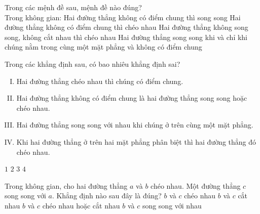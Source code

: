 \begin{ex}%
	Trong các mệnh đề sau, mệnh đề nào đúng?\\
	Trong không gian:
	\choice
	{Hai đường thẳng không có điểm chung thì song song}
	{Hai đường thẳng không có điểm chung thì chéo nhau}
	{Hai đường thẳng không song song, không cắt nhau thì chéo nhau}
	{\True Hai đường thẳng song song khi và chỉ khi chúng nằm trong cùng một mặt phẳng và không có điểm chung}
\end{ex}

\begin{ex}%
Trong các khẳng định sau, có bao nhiêu khẳng định sai?
\begin{enumerate}[(I)]
	\item 	Hai đường thẳng chéo nhau thì chúng có điểm chung.
	\item 
	Hai đường thẳng không có điểm chung là hai đường thẳng song song hoặc chéo nhau.
	\item Hai đường thẳng song song với nhau khi chúng ở trên cùng một mặt phẳng.
	\item Khi hai đường thẳng ở trên hai mặt phẳng phân biệt thì hai đường thẳng đó chéo nhau.
\end{enumerate}
	\choice
	{$1$}
	{$2$}
	{\True $3$}
	{$4$}
\end{ex}

\begin{ex}%
Trong không gian, cho hai đường thẳng $ a$ và $ b$ chéo nhau. Một đường thẳng $ c$ song song với $ a$. Khẳng định nào sau đây là đúng?
\choice
{$ b$ và $ c$ chéo nhau}
{$ b$ và $ c$ cắt nhau}
{\True $ b$ và $ c$ chéo nhau hoặc cắt nhau}
{$ b$ và $ c$ song song với nhau}
\end{ex}

